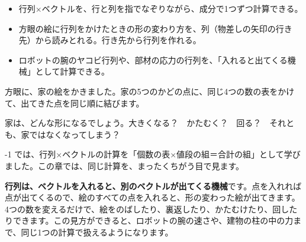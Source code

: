 
\begin{goal}
\begin{itemize}[label={\color{\bkTT}●}, leftmargin=1.6\zw, itemsep=0pt, topsep=1pt]
\item {}\enspace 行列×ベクトルを、行と列を指でなぞりながら、成分で1つずつ計算できる。
\item {}\enspace 方眼の絵に行列をかけたときの形の変わり方を、列（物差しの矢印の行き先）から読みとれる。行き先から行列を作れる。
\item {}\enspace ロボットの腕のヤコビ行列や、部材の応力の行列を、「入れると出てくる機械」として計算できる。
\end{itemize}
\end{goal}

\begin{hatena}
\noindent\begin{minipage}[c]{0.5\linewidth}
\raggedright
方眼に、家の絵をかきました。家の5つのかどの点に、同じ4つの数の表をかけて、出てきた点を同じ順に結びます。

家は、どんな形になるでしょう。大きくなる？　かたむく？　回る？　それとも、家ではなくなってしまう？
\end{minipage}\hfill
\begin{minipage}[c]{0.47\linewidth}
\centering
{}
\end{minipage}
\end{hatena}

-1 では、行列×ベクトルの計算を「個数の表×値段の組＝合計の組」として学びました。この章では、同じ計算を、まったくちがう目で見ます。

\textbf{行列は、ベクトルを入れると、別のベクトルが出てくる機械}です。点を入れれば点が出てくるので、絵のすべての点を入れると、形の変わった絵が出てきます。4つの数を変えるだけで、絵をのばしたり、裏返したり、かたむけたり、回したりできます。この見方ができると、ロボットの腕の速さや、建物の柱の中の力まで、同じ1つの計算で扱えるようになります。

